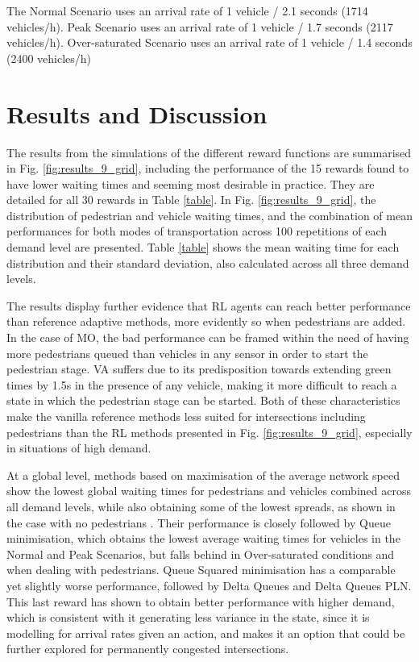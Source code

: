 \documentclass[conference]{IEEEtran}
\begin{document}
The Normal Scenario uses an arrival rate of 1 vehicle / 2.1 seconds (1714 vehicles/h). Peak Scenario uses an arrival rate of 1 vehicle / 1.7 seconds (2117 vehicles/h). Over-saturated Scenario uses an arrival rate of 1 vehicle / 1.4 seconds (2400 vehicles/h)


\section{Results and Discussion}
\label{results}
The results from the simulations of the different reward functions are summarised in Fig. \ref{fig:results_9_grid}, including the performance of the 15 rewards found to have lower waiting times and seeming most desirable in practice. They are detailed for all 30 rewards in Table \ref{table}.
In Fig. \ref{fig:results_9_grid}, the distribution of pedestrian and vehicle waiting times, and the combination of mean performances for both modes of transportation across 100 repetitions of each demand level are presented.
Table \ref{table} shows the mean waiting time for each distribution and their standard deviation, also calculated across all three demand levels. 

The results display further evidence that RL agents can reach better performance than reference adaptive methods, more evidently so when pedestrians are added.
In the case of MO, the bad performance can be framed within the need of having more pedestrians queued than vehicles in any sensor in order to start the pedestrian stage.
VA suffers due to its predisposition towards extending green times by 1.5s in the presence of any vehicle, making it more difficult to reach a state in which the pedestrian stage can be started.
Both of these characteristics make the vanilla reference methods less suited for intersections including pedestrians than the RL methods presented in Fig. \ref{fig:results_9_grid}, especially in situations of high demand.

At a global level, methods based on maximisation of the average network speed show the lowest global waiting times for pedestrians and vehicles combined across all demand levels, while also obtaining some of the lowest spreads, as shown in the case with no pedestrians \cite{previous}.
Their performance is closely followed by Queue minimisation, which obtains the lowest average waiting times for vehicles in the Normal and Peak Scenarios, but falls behind in Over-saturated conditions and when dealing with pedestrians.
Queue Squared minimisation has a comparable yet slightly worse performance, followed by Delta Queues and Delta Queues PLN.
This last reward has shown to obtain better performance with higher demand, which is consistent with it generating less variance in the state, since it is modelling for arrival rates given an action, and makes it an option that could be further explored for permanently congested intersections.
\end{document}
